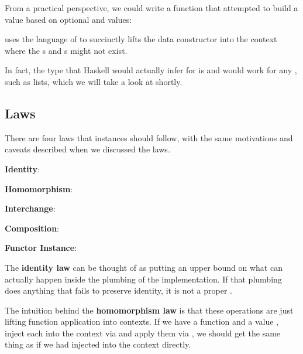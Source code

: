From a practical perspective, we could write a function that attempted to build a  value based on
optional  and  values:



 uses the language of  to succinctly lifts the  data constructor
into the  context where the s and s might not exist.

In fact, the type that Haskell would actually infer for  is
 and would work for any , such as 
lists, which we will take a look at shortly.

\subsection{ Laws}

There are four laws that  instances should follow, with the same motivations and caveats described when
we discussed the  laws.

\begin{notelist}
    \item \textbf{Identity}: 
    \item \textbf{Homomorphism}: 
    \item \textbf{Interchange}: 
    \item \textbf{Composition}: 
    \item \textbf{Functor Instance}: 
\end{notelist}

The \textbf{identity law} can be thought of as putting an upper bound on what can actually happen inside the plumbing of
the  implementation. If that plumbing does anything that fails to preserve identity, it
is not a proper .

The intuition behind the \textbf{homomorphism law} is that these operations are just lifting function application into
 contexts. If we have a function  and a value , inject each into the context
via  and apply them via \code{(<*>)}, we should get the same thing as if we had injected
 into the context directly.

